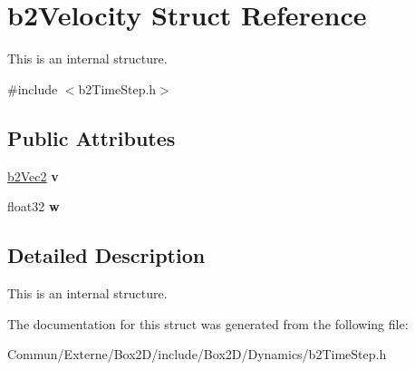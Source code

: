 \hypertarget{structb2_velocity}{}\section{b2\+Velocity Struct Reference}
\label{structb2_velocity}


This is an internal structure.  




{\ttfamily \#include $<$b2\+Time\+Step.\+h$>$}

\subsection*{Public Attributes}
\begin{DoxyCompactItemize}
\item 
\hyperlink{structb2_vec2}{b2\+Vec2} {\bfseries v}\hypertarget{structb2_velocity_a73b92ceff532491e71b9dbc53eecaa70}{}\label{structb2_velocity_a73b92ceff532491e71b9dbc53eecaa70}

\item 
float32 {\bfseries w}\hypertarget{structb2_velocity_a6ce6f6c83ceb95100532d3f2b0485b83}{}\label{structb2_velocity_a6ce6f6c83ceb95100532d3f2b0485b83}

\end{DoxyCompactItemize}


\subsection{Detailed Description}
This is an internal structure. 

The documentation for this struct was generated from the following file\+:\begin{DoxyCompactItemize}
\item 
Commun/\+Externe/\+Box2\+D/include/\+Box2\+D/\+Dynamics/b2\+Time\+Step.\+h\end{DoxyCompactItemize}
